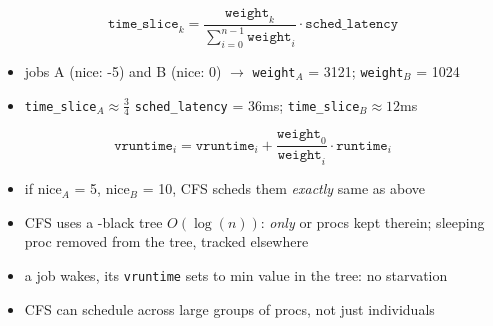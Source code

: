 \vspace{-.3em}
\begin{equation}
  \label{eq:timeslice}
  \texttt{time\_slice}_{k} = \frac{\texttt{weight}_{k}}{\sum_{i=0}^{n-1}\texttt{weight}_{i}}\cdot \texttt{sched\_latency}
\end{equation}
\begin{itemize}
\item jobs A (nice: -5) and B (nice: 0) $\to$ \texttt{weight}$_{A}$ = 3121; \texttt{weight}$_{B}$ = 1024
\item \texttt{time\_slice}$_{A} \approx \frac{3}{4}$ \texttt{sched\_latency} = 36ms; \texttt{time\_slice}$_{B} \approx 12$ms
\end{itemize}
\begin{equation}
  \label{eq:vruntime}
  \texttt{vruntime}_{i} = \texttt{vruntime}_{i} + \frac{\texttt{weight}_{0}}{\texttt{weight}_{i}}\cdot \texttt{runtime}_{i}
\end{equation}
\begin{itemize}
\item if nice$_{A}$ = 5, nice$_{B}$ = 10, CFS scheds them \emph{exactly} same as above
\item CFS uses a -black tree $O(\log(n))$: \emph{only}  or  procs kept therein; sleeping proc removed from the tree, tracked elsewhere
\item a job wakes, its \texttt{vruntime} sets to min value in the tree: no starvation
\item CFS can schedule across large groups of procs, not just individuals
\end{itemize}
